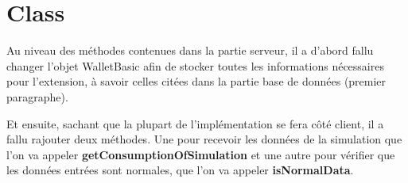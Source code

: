 \section{Class}

\begin{flushleft}
Au niveau des méthodes contenues dans la partie serveur, il a d'abord fallu changer l'objet WalletBasic afin de stocker toutes les informations nécessaires pour l'extension, à savoir celles citées dans la partie base de données (premier paragraphe).
\end{flushleft}

\begin{flushleft}
Et ensuite, sachant que la plupart de l'implémentation se fera côté client, il a fallu rajouter deux méthodes. Une pour recevoir les données de la simulation que l'on va appeler \textbf{getConsumptionOfSimulation} et une autre pour vérifier que les données entrées sont normales, que l'on va appeler \textbf{isNormalData}.
\end{flushleft}

